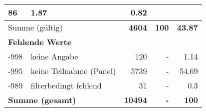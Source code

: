 \begin{longtable}{lXrrr}
       \num{86} &
       \num[round-mode=places,round-precision=2]{1.87} &
         \num[round-mode=places,round-precision=2]{0.82} \\
     \midrule
     \multicolumn{2}{l}{Summe (gültig)} &
       \textbf{\num{4604}} &
     \textbf{\num{100}} &
       \textbf{\num[round-mode=places,round-precision=2]{43.87}} \\
     \multicolumn{5}{l}{\textbf{Fehlende Werte}}\\
       -998 &
       keine Angabe &
         \num{120} &
        - &
         \num[round-mode=places,round-precision=2]{1.14} \\
       -995 &
       keine Teilnahme (Panel) &
         \num{5739} &
        - &
         \num[round-mode=places,round-precision=2]{54.69} \\
       -989 &
       filterbedingt fehlend &
         \num{31} &
        - &
         \num[round-mode=places,round-precision=2]{0.3} \\
     \midrule
     \multicolumn{2}{l}{\textbf{Summe (gesamt)}} &
          \textbf{\num{10494}} &
        \textbf{-} &
        \textbf{\num{100}} \\
     \bottomrule
     \end{longtable}
     
